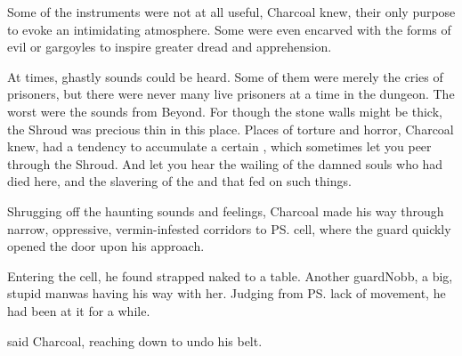 Some of the instruments were not at all useful, Charcoal knew, their only purpose to evoke an intimidating atmosphere. 
Some were even encarved with the forms of evil \daemons{} or gargoyles to inspire greater dread and apprehension. 

At times, ghastly sounds could be heard. 
Some of them were merely the cries of prisoners, but there were never many live prisoners at a time in the dungeon. 
The worst were the sounds from Beyond. 
For though the stone walls might be thick, the Shroud was precious thin in this place. 
Places of torture and horror, Charcoal knew, had a tendency to accumulate a certain , which sometimes let you peer through the Shroud. 
And let you hear the wailing of the damned souls who had died here, and the slavering of the \daemons{} and \qliphoth{} that fed on such things. 

Shrugging off the haunting sounds and feelings, Charcoal made his way through narrow, oppressive, vermin-infested corridors to \ps{\Constance}{} cell, where the guard quickly opened the door upon his approach. 

Entering the cell, he found \Constance{} strapped naked to a table. 
Another guard\dash Nobb, a big, stupid man\dash was having his way with her. 
Judging from \ps{\Constance}{} lack of movement, he had been at it for a while. 

 said Charcoal, reaching down to undo his belt. 







